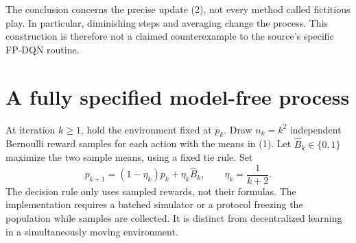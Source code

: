 \documentclass[11pt,a4paper]{article}
\begin{document}
The conclusion concerns the precise update (2), not every method called fictitious play. In particular, diminishing steps and averaging change the process. This construction is therefore not a claimed counterexample to the source's specific FP-DQN routine.
\section{A fully specified model-free process}
At iteration $k\ge1$, hold the environment fixed at $p_k$. Draw $n_k=k^2$ independent Bernoulli reward samples for each action with the means in (1). Let $\widehat B_k\in\{0,1\}$ maximize the two sample means, using a fixed tie rule. Set
\[
 p_{k+1}=(1-\eta_k)p_k+\eta_k\widehat B_k,\qquad
 \eta_k=\frac1{k+2}.
 \tag{3}
\]
The decision rule only uses sampled rewards, not their formulas. The implementation requires a batched simulator or a protocol freezing the population while samples are collected. It is distinct from decentralized learning in a simultaneously moving environment.
\end{document}
